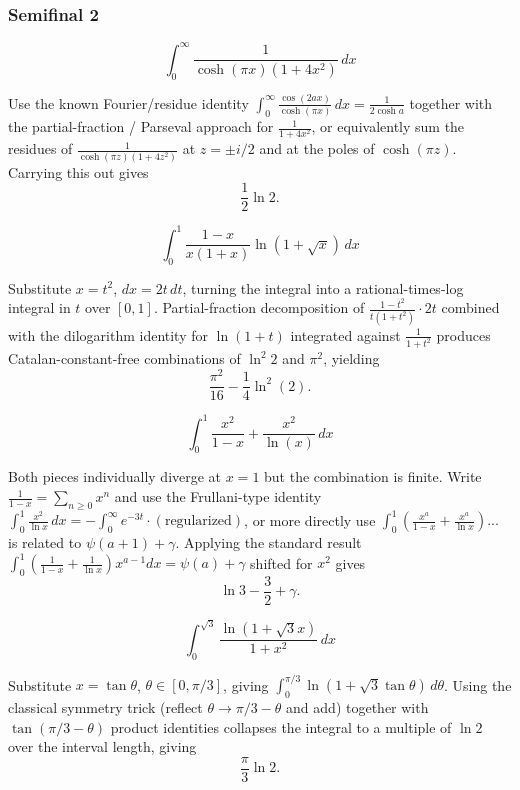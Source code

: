 \subsubsection*{Semifinal 2}
\begin{questions}

\question
\[
\int_0^{\infty} \frac{1}{\cosh(\pi x)(1+4x^2)} \, dx
\]
\begin{solution}
Use the known Fourier/residue identity $\int_0^\infty \frac{\cos(2ax)}{\cosh(\pi x)}\,dx = \frac{1}{2\cosh a}$ together with the partial-fraction / Parseval approach for $\frac{1}{1+4x^2}$, or equivalently sum the residues of $\frac{1}{\cosh(\pi z)(1+4z^2)}$ at $z=\pm i/2$ and at the poles of $\cosh(\pi z)$. Carrying this out gives
\[
\frac{1}{2}\ln 2.
\]
\end{solution}

\question
\[
\int_0^1 \frac{1-x}{x(1+x)}\ln\left(1+\sqrt{x}\right) \, dx
\]
\begin{solution}
Substitute $x=t^2$, $dx=2t\,dt$, turning the integral into a rational-times-log integral in $t$ over $[0,1]$. Partial-fraction decomposition of $\frac{1-t^2}{t(1+t^2)}\cdot 2t$ combined with the dilogarithm identity for $\ln(1+t)$ integrated against $\frac{1}{1+t^2}$ produces Catalan-constant-free combinations of $\ln^2 2$ and $\pi^2$, yielding
\[
\frac{\pi^2}{16}-\frac{1}{4}\ln^2(2).
\]
\end{solution}

\question
\[
\int_0^1 \frac{x^2}{1-x}+\frac{x^2}{\ln(x)} \, dx
\]
\begin{solution}
Both pieces individually diverge at $x=1$ but the combination is finite. Write $\frac{1}{1-x}=\sum_{n\ge0}x^n$ and use the Frullani-type identity $\int_0^1 \frac{x^2}{\ln x}\,dx = -\int_0^\infty e^{-3t}\cdot(\text{regularized})$, or more directly use $\int_0^1\left(\frac{x^{a}}{1-x}+\frac{x^{a}}{\ln x}\right)... $ is related to $\psi(a+1)+\gamma$. Applying the standard result $\int_0^1\left(\frac{1}{1-x}+\frac{1}{\ln x}\right)x^{a-1}dx=\psi(a)+\gamma$ shifted for $x^2$ gives
\[
\ln 3-\frac{3}{2}+\gamma.
\]
\end{solution}

\question
\[
\int_0^{\sqrt3} \frac{\ln\left(1+\sqrt{3}x\right)}{1+x^2} \, dx
\]
\begin{solution}
Substitute $x=\tan\theta$, $\theta\in[0,\pi/3]$, giving $\int_0^{\pi/3}\ln(1+\sqrt3\tan\theta)\,d\theta$. Using the classical symmetry trick (reflect $\theta\to\pi/3-\theta$ and add) together with $\tan(\pi/3-\theta)$ product identities collapses the integral to a multiple of $\ln 2$ over the interval length, giving
\[
\frac{\pi}{3}\ln 2.
\]
\end{solution}


\end{questions}
